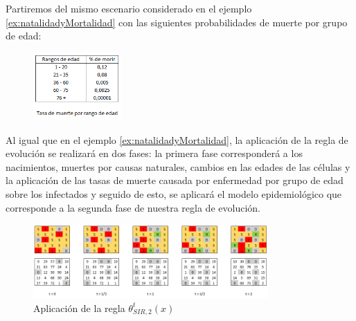 \begin{example}
Partiremos del mismo escenario considerado en el ejemplo \ref{ex:natalidadyMortalidad} con las siguientes probabilidades de muerte por grupo de edad:

\begin{figure}[h]
  \centering
    \includegraphics[width=0.3\textwidth]{Imagenes/muertePorEnfermedad.PNG}
\end{figure}

Al igual que en el ejemplo \ref{ex:natalidadyMortalidad}, la aplicación de la regla de evolución se realizará en dos fases: la primera fase corresponderá a los nacimientos, muertes por causas naturales, cambios en las edades de las células y la aplicación de las tasas de muerte causada por enfermedad por grupo de edad sobre los infectados y seguido de esto, se aplicará el modelo epidemiológico que corresponde a la segunda fase de nuestra regla de evolución.

\begin{figure}[h]
  \centering
    \includegraphics[width=0.8\textwidth]{Imagenes/muertePorEnfermedadEvo.PNG}
    \caption{Aplicación de la regla $\theta_{SIR,2}^t(x)$}
\end{figure}
\end{example}

\newpage

